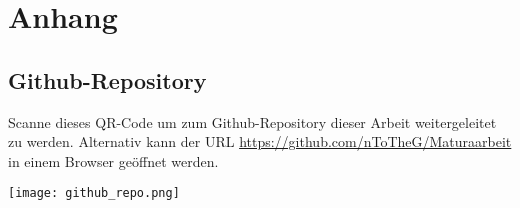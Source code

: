 \chapter*{Anhang}

\section*{Github-Repository}

Scanne dieses QR-Code um zum Github-Repository dieser Arbeit weitergeleitet zu werden. Alternativ kann der URL
\url{https://github.com/nToTheG/Maturaarbeit} in einem Browser geöffnet werden.

\begin{center}
    \begin{imgbox}
        \centering
        \texttt{[image: github\_repo.png]}
    \end{imgbox}
\end{center}
